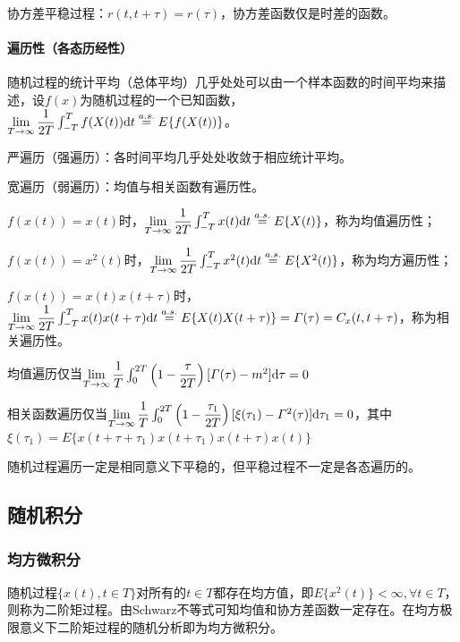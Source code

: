 \documentclass[11pt,a4paper]{ctexart}
\renewcommand{\d}{{\rm d}}
\begin{document}
        协方差平稳过程：$r(t,t+\tau)=r(\tau)$，协方差函数仅是时差的函数。

        \paragraph{遍历性（各态历经性）}\leavevmode
        
        随机过程的统计平均（总体平均）几乎处处可以由一个样本函数的时间平均来描述，设$f(x)$为随机过程的一个已知函数，$\lim\limits_{T\rightarrow\infty}\dfrac{1}{2T}\int_{-T}^{T}f(X(t))\d t \overset{a.s.}{=}E\{f(X(t))\}$。

        严遍历（强遍历）：各时间平均几乎处处收敛于相应统计平均。
        
        宽遍历（弱遍历）：均值与相关函数有遍历性。

        $f(x(t))=x(t)$时，$\lim\limits_{T\rightarrow\infty}\dfrac{1}{2T}\int_{-T}^{T}x(t)\d t \overset{a.s.}{=}E\{X(t)\}$，称为均值遍历性；

        $f(x(t))=x^2(t)$时，$\lim\limits_{T\rightarrow\infty}\dfrac{1}{2T}\int_{-T}^{T}x^2(t)\d t \overset{a.s.}{=}E\{X^2(t)\}$，称为均方遍历性；

        $f(x(t))=x(t)x(t+\tau)$时，$\lim\limits_{T\rightarrow\infty}\dfrac{1}{2T}\int_{-T}^{T}x(t)x(t+\tau)\d t \overset{a.s.}{=}E\{X(t)X(t+\tau)\}=\varGamma(\tau)=C_x(t,t+\tau)$，称为相关遍历性。

        均值遍历仅当$\lim\limits_{T\rightarrow\infty}\dfrac{1}{T}\int_{0}^{2T}\left(1-\dfrac{\tau}{2T}\right)[\varGamma(\tau)-m^2]\d\tau=0$

        相关函数遍历仅当$\lim\limits_{T\rightarrow\infty}\dfrac{1}{T}\int_{0}^{2T}\left(1-\dfrac{\tau_1}{2T}\right)[\xi(\tau_1)-\varGamma^2(\tau)]\d\tau_1=0$，其中$\xi(\tau_1)=E\{x(t+\tau+\tau_1)x(t+\tau_1)x(t+\tau)x(t)\}$

        随机过程遍历一定是相同意义下平稳的，但平稳过程不一定是各态遍历的。
    \subsection{随机积分}
        \subsubsection{均方微积分}
            随机过程$\{x(t),t\in T\}$对所有的$t\in T$都存在均方值，即$E\{x^2(t)\}<\infty,\forall t\in T$，则称为二阶矩过程。由Schwarz不等式可知均值和协方差函数一定存在。在均方极限意义下二阶矩过程的随机分析即为均方微积分。
\end{document}
